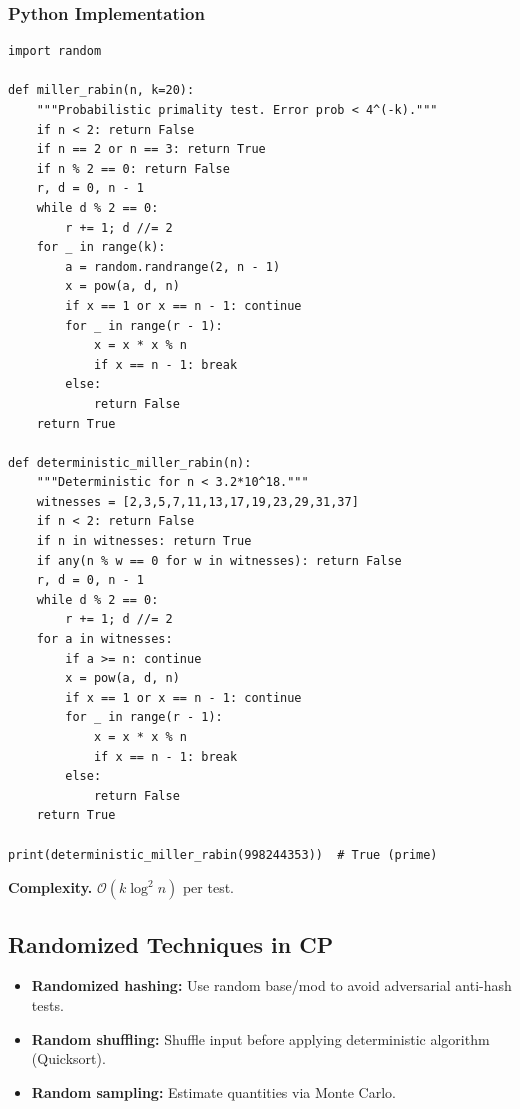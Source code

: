 \documentclass[10pt,a4paper]{article}
\theoremstyle{cpstyle}
\newcommand{\bigO}[1]{\mathcal{O}\!\left(#1\right)}
\begin{document}
\subsubsection{Python Implementation}
\begin{lstlisting}[caption={Randomized algorithms -- Miller-Rabin primality and random hash}]
import random

def miller_rabin(n, k=20):
    """Probabilistic primality test. Error prob < 4^(-k)."""
    if n < 2: return False
    if n == 2 or n == 3: return True
    if n % 2 == 0: return False
    r, d = 0, n - 1
    while d % 2 == 0:
        r += 1; d //= 2
    for _ in range(k):
        a = random.randrange(2, n - 1)
        x = pow(a, d, n)
        if x == 1 or x == n - 1: continue
        for _ in range(r - 1):
            x = x * x % n
            if x == n - 1: break
        else:
            return False
    return True

def deterministic_miller_rabin(n):
    """Deterministic for n < 3.2*10^18."""
    witnesses = [2,3,5,7,11,13,17,19,23,29,31,37]
    if n < 2: return False
    if n in witnesses: return True
    if any(n % w == 0 for w in witnesses): return False
    r, d = 0, n - 1
    while d % 2 == 0:
        r += 1; d //= 2
    for a in witnesses:
        if a >= n: continue
        x = pow(a, d, n)
        if x == 1 or x == n - 1: continue
        for _ in range(r - 1):
            x = x * x % n
            if x == n - 1: break
        else:
            return False
    return True

print(deterministic_miller_rabin(998244353))  # True (prime)
\end{lstlisting}

\textbf{Complexity.} $\bigO{k \log^2 n}$ per test.

\subsection{Randomized Techniques in CP}

\begin{itemize}[noitemsep]
  \item \textbf{Randomized hashing:} Use random base/mod to avoid adversarial anti-hash tests.
  \item \textbf{Random shuffling:} Shuffle input before applying deterministic algorithm (Quicksort).
  \item \textbf{Random sampling:} Estimate quantities via Monte Carlo.
\end{itemize}
\end{document}
